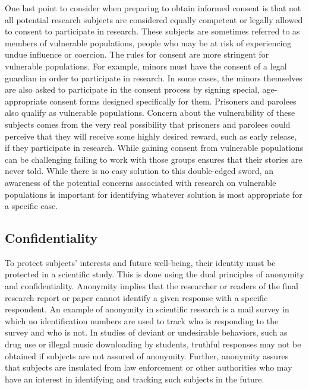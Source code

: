 One last point to consider when preparing to obtain informed consent is that not all potential research subjects are considered equally competent or legally allowed to consent to participate in research. These subjects are sometimes referred to as members of vulnerable populations, people who may be at risk of experiencing undue influence or coercion. The rules for consent are more stringent for vulnerable populations. For example, minors must have the consent of a legal guardian in order to participate in research. In some cases, the minors themselves are also asked to participate in the consent process by signing special, age-appropriate consent forms designed specifically for them. Prisoners and parolees also qualify as vulnerable populations. Concern about the vulnerability of these subjects comes from the very real possibility that prisoners and parolees could perceive that they will receive some highly desired reward, such as early release, if they participate in research. While gaining consent from vulnerable populations can be challenging failing to work with those groups ensures that their stories are never told. While there is no easy solution to this double-edged sword, an awareness of the potential concerns associated with research on vulnerable populations is important for identifying whatever solution is most appropriate for a specific case.

\subsection{Confidentiality}

To protect subjects' interests and future well-being, their identity must be protected in a scientific study. This is done using the dual principles of anonymity and confidentiality. Anonymity implies that the researcher or readers of the final research report or paper cannot identify a given response with a specific respondent. An example of anonymity in scientific research is a mail survey in which no identification numbers are used to track who is responding to the survey and who is not. In studies of deviant or undesirable behaviors, such as drug use or illegal music downloading by students, truthful responses may not be obtained if subjects are not assured of anonymity. Further, anonymity assures that subjects are insulated from law enforcement or other authorities who may have an interest in identifying and tracking such subjects in the future.


